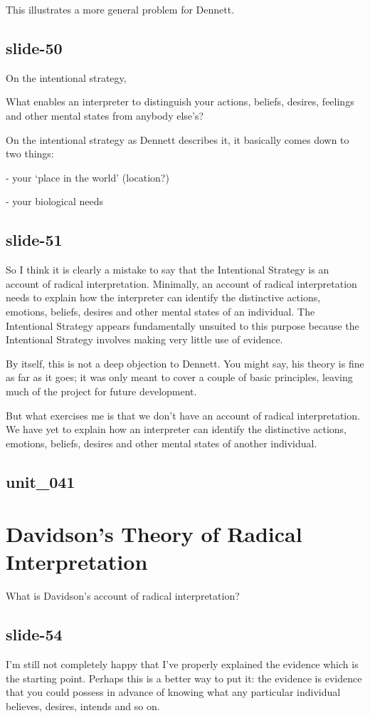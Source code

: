 \documentclass[12pt,\papersize]{extarticle}
\begin{document}
This illustrates a more general problem for Dennett.

\subsection{slide-50}
On the intentional strategy,

What enables an interpreter to distinguish your actions, beliefs, desires,
feelings and other mental states from anybody else’s?

On the intentional strategy as Dennett describes it, it basically comes
down to two things:

- your ‘place in the world’ (location?)

- your biological needs


\subsection{slide-51}
So I think it is clearly a mistake to say that the Intentional Strategy
is an account of radical interpretation.
Minimally, an account of radical interpretation needs to explain how
the interpreter can identify the distinctive actions, emotions,
beliefs, desires and other
mental states of an individual.
The Intentional Strategy appears fundamentally unsuited to this purpose
because the Intentional Strategy involves making very little use of evidence.

By itself,
this is not a deep objection to Dennett.  You might say, his theory
is fine as far as it goes; it was only meant to cover a couple of basic
principles, leaving much of the project for future development.

But what exercises me is that we don’t have an account of radical interpretation.
We have yet to explain how
an interpreter can identify the distinctive actions, emotions,
beliefs, desires and other
mental states of another individual.

\subsection{unit\_041}


\section{Davidson’s Theory of Radical Interpretation}

What is Davidson’s account of radical interpretation?

\subsection{slide-54}
I’m still not completely happy that I’ve properly explained the evidence
which is the starting point.
Perhaps this is a better way to put it:
the evidence is evidence that you could possess in advance of knowing
what any particular individual believes, desires, intends and so on.
\end{document}
